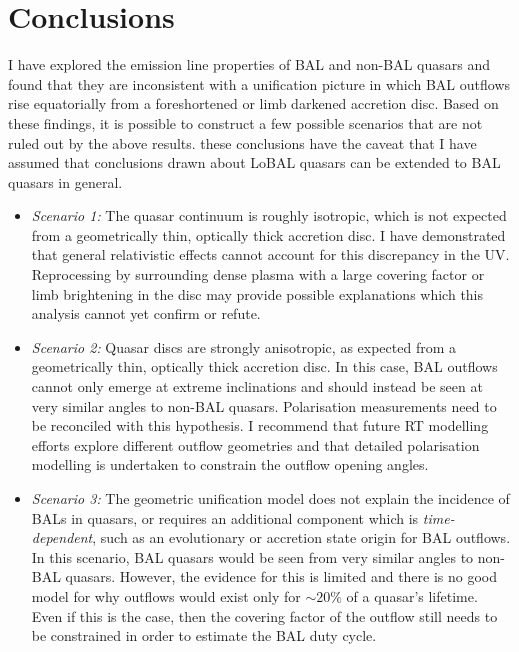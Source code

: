 \section{Conclusions}
\label{sec:ew_conclusions}
I have explored the emission line properties of BAL and non-BAL quasars 
and found that they are inconsistent with a unification picture in which 
BAL outflows rise equatorially from a foreshortened or limb darkened accretion
disc. Based on these findings, it is possible to 
construct a few possible scenarios that are not ruled out by the above results.
these conclusions have the caveat that I have assumed that conclusions drawn about
LoBAL quasars can be extended to BAL quasars in general.
\begin{itemize}
	\item {\sl Scenario 1:} The quasar continuum is roughly isotropic, which is not 
	expected from a geometrically thin, optically thick accretion disc.
    I have demonstrated that general relativistic effects cannot account for this discrepancy in the 
    UV. Reprocessing by surrounding dense plasma with a large covering factor or limb brightening 
    in the disc may provide possible explanations which this analysis cannot yet confirm or refute.
    \smallskip
	\item {\sl Scenario 2:} Quasar discs are strongly anisotropic, as expected from a 
	geometrically thin, optically thick accretion disc. In this case, BAL outflows cannot 
	only emerge at extreme inclinations and should instead be seen at very similar angles
	to non-BAL quasars. Polarisation measurements need to be reconciled with this hypothesis.
	I recommend that future RT modelling efforts explore different outflow 
	geometries and that detailed polarisation modelling is undertaken to constrain the 
	outflow opening angles.
	\smallskip
	\item  {\sl Scenario 3:} The geometric unification model does not explain the incidence of 
	BALs in quasars, or requires an additional component which is {\em time-dependent}, 
	such as an evolutionary or accretion state origin for BAL outflows. In this scenario, 
	BAL quasars would be seen from very similar angles to non-BAL quasars. However, the 
	evidence for this is limited and there is no good model for why outflows would exist 
	only for $\sim 20\%$ of a quasar's lifetime. Even if this is the case, then the covering 
	factor of the outflow still needs to be constrained in order to estimate the BAL duty cycle.
\end{itemize}
